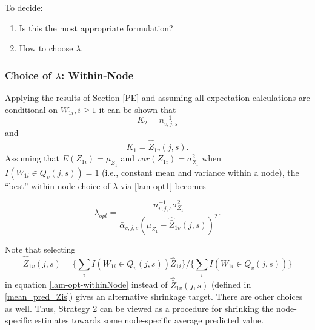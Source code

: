 \documentclass[12pt]{article}
\begin{document}
To decide: 
\begin{enumerate}
	\item Is this the most appropriate formulation? 
	\item How to choose $\lambda$.
\end{enumerate}



\subsubsection{Choice of $\lambda$: Within-Node }
Applying the results of Section \ref{PE} and assuming all expectation
calculations are conditional on $W_{1i}, i \geq 1$ it can be shown that
\[
K_2 = n^{-1}_{v,j,s}
\]
and
\[
K_1 = \hat{\bar{Z}}_{1v}(j,s).
\]
Assuming that $E(Z_{1i}) = \mu_{Z_1}$ and $var(Z_{1i}) = \sigma^2_{Z_1}$ when $I(
W_{1i} \in Q_{v}(j,s) ) =1$ (i.e., constant mean and variance within a
node), the ``best'' within-node choice of $\lambda$ via
\eqref{lam-opt1} becomes

\begin{equation}
\label{lam-opt-withinNode}
\lambda_{opt} = \frac{n^{-1}_{v,j,s} \sigma^2_{Z_1}}{ \bar{\alpha}_{v,j,s} (\mu_{Z_1} -  \hat{\bar{Z}}_{1v}(j,s))^2}.
\end{equation}

Note that selecting 
\[
\hat{\bar{Z}}_{1v}(j,s) =
\{ \sum_i I(W_{1i} \in Q_{v}(j,s))  \hat{Z}_{1i} \}
/ \{ \sum_i I(W_{1i} \in Q_{v}(j,s))  \}
\]
in equation \eqref{lam-opt-withinNode}  instead of $\hat{\bar{Z}}_{1v}(j,s)$ (defined in \eqref{mean_pred_Zis}) gives an alternative shrinkage target.  There are other choices as well. Thus, Strategy 2 can be viewed as a procedure for
shrinking the node-specific estimates towards some node-specific
average predicted value.



\end{document}
